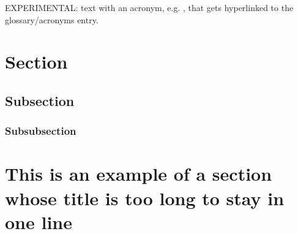 \documentclass[12pt,desert]{cool-white-paper}
\begin{document}
EXPERIMENTAL: text with an acronym, e.g. , that gets hyperlinked to the glossary/acronyms entry.

\section{Section}
\lipsum[1]
\subsection{Subsection}
\lipsum[2]
\subsubsection{Subsubsection}
\lipsum[3]

\section[This is an example of a section whose title is too long to stay in one line]{This is an example of a section whose title is too long \stnl to stay in one line}
\lipsum[4]

\end{document}
